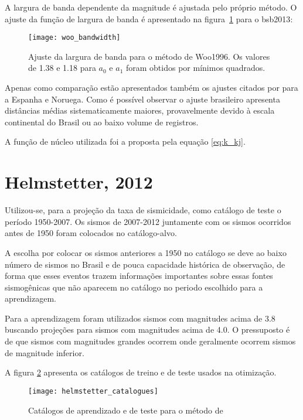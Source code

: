 A largura de banda dependente da magnitude é ajustada pelo próprio método.
O ajuste da função de largura de banda é apresentado na figura~\ref{fig:woo_b} para o \gls{bsb2013}:

\begin{figure}[H]
  \centering
  \texttt{[image: woo\_bandwidth]} 
  \caption{Ajuste da largura de banda para o método de Woo1996.
  	Os valores de 1.38 e 1.18 para $a_0$ e $a_1$ foram obtidos por mínimos quadrados.}
  \label{fig:woo_b} 
\end{figure}

Apenas como comparação estão apresentados também os ajustes citados por \citet{beauval_2003} para a Espanha e Noruega.
Como é possível observar o ajuste brasileiro apresenta distâncias médias sistematicamente maiores, provavelmente
devido à escala continental do Brasil ou ao baixo volume de registros.

A função de núcleo utilizada foi a proposta pela equação \eqref{eq:k_kj}.

\section{Helmstetter, 2012}
\label{sec:proc_helmstetter}

Utilizou-se, para a projeção da taxa de sismicidade, como catálogo de teste
o período 1950-2007. Os sismos de 2007-2012 juntamente
com os sismos ocorridos antes de 1950 foram colocados no catálogo-alvo.

A escolha por colocar os sismos anteriores a 1950 no catálogo se deve ao baixo número
de sismos no Brasil e de pouca capacidade histórica de observação, de forma que esses eventos trazem informações
importantes sobre essas fontes sismogênicas que não aparecem no catálogo no periodo escolhido para a aprendizagem.

Para a aprendizagem foram utilizados sismos com magnitudes acima de 3.8 buscando projeções para
sismos com magnitudes acima de 4.0. O pressuposto é de que sismos com magnitudes grandes
ocorrem onde geralmente ocorrem sismos de magnitude inferior.

A figura \ref{fig:h_catalogue} apresenta os catálogos de treino e de teste usados na otimização.

\begin{figure}[H]
  \centering
  \texttt{[image: helmstetter\_catalogues]} 
  \caption{Catálogos de aprendizado e de teste para o método de \citet{helmstetter_2012}}
  \label{fig:h_catalogue} 
\end{figure}

